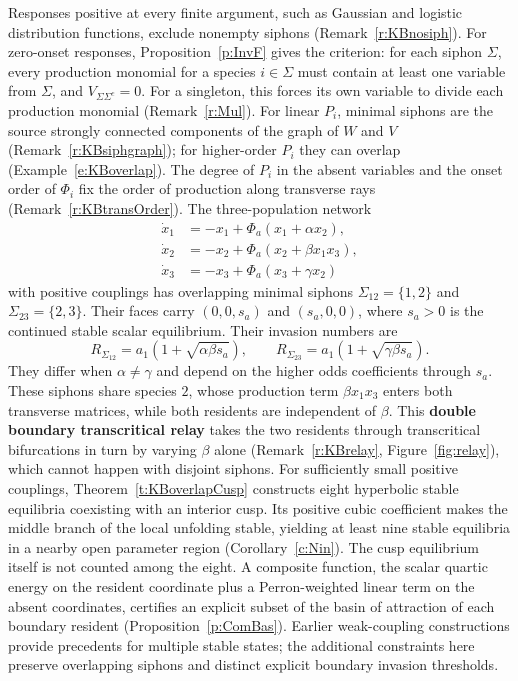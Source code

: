 \begin{enumerate}
Responses positive at every finite argument, such as Gaussian and logistic distribution functions,
exclude nonempty siphons (Remark~\ref{r:KBnosiph}). For zero-onset responses,
Proposition~\ref{p:InvF} gives the criterion:
for each siphon $\Sigma$, every production monomial for a species
$i\in\Sigma$ must contain at least one variable from $\Sigma$,
and $V_{\Sigma\Sigma^c}=0$. For a singleton, this forces its own
variable to divide each production monomial (Remark~\ref{r:Mul}).
For linear $P_i$, minimal siphons are the source strongly connected components of the
graph of $W$ and $V$ (Remark~\ref{r:KBsiphgraph}); for higher-order $P_i$ they can overlap
(Example~\ref{e:KBoverlap}). The degree of $P_i$ in the absent variables and the onset order
of $\Phi_i$ fix the order of production along transverse rays (Remark~\ref{r:KBtransOrder}).
The three-population network
\[
 \begin{aligned}
 \dot x_1&=-x_1+\Phi_a(x_1+\alpha x_2),\\
 \dot x_2&=-x_2+\Phi_a(x_2+\beta x_1x_3),\\
 \dot x_3&=-x_3+\Phi_a(x_3+\gamma x_2)
 \end{aligned}
\]
with positive couplings has overlapping minimal siphons
$\Sigma_{12}=\{1,2\}$ and $\Sigma_{23}=\{2,3\}$.
Their faces carry $(0,0,s_a)$ and $(s_a,0,0)$, where $s_a>0$
is the continued stable scalar equilibrium. Their invasion numbers are
\[
 R_{\Sigma_{12}}=a_1(1+\sqrt{\alpha\beta s_a}),\qquad
 R_{\Sigma_{23}}=a_1(1+\sqrt{\gamma\beta s_a}).
\]
They differ when $\alpha\ne\gamma$ and depend on the higher odds
coefficients through $s_a$.
These siphons share species $2$, whose production term $\beta x_1x_3$ enters both transverse matrices, while
both residents are independent of $\beta$. This \textbf{double boundary transcritical relay} takes the two residents
through transcritical bifurcations in turn by varying $\beta$ alone (Remark~\ref{r:KBrelay}, Figure~\ref{fig:relay}), which cannot
happen with disjoint siphons.
For sufficiently small positive couplings, Theorem~\ref{t:KBoverlapCusp}
constructs eight hyperbolic stable equilibria coexisting with an
interior cusp. Its positive cubic coefficient makes the middle
branch of the local unfolding stable, yielding at least nine stable
equilibria in a nearby open parameter region (Corollary~\ref{c:Nin}).
The cusp equilibrium itself is not counted among the eight.
A composite function, the scalar quartic energy on the resident coordinate plus a Perron-weighted
linear term on the absent coordinates, certifies an explicit subset of the basin of attraction of each boundary resident
(Proposition~\ref{p:ComBas}).
Earlier weak-coupling constructions \cite{Izhikevich1998,Boud26}
provide precedents for multiple stable states; the additional
constraints here preserve overlapping siphons and distinct explicit
boundary invasion thresholds.


\end{enumerate}
